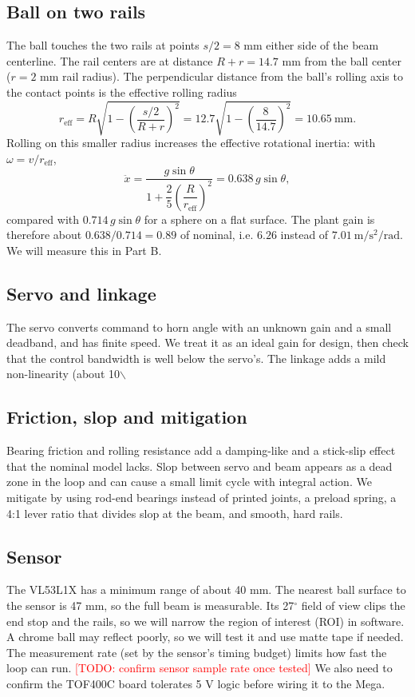 \documentclass[11pt]{article}
\newcommand{\todo}[1]{\textcolor{red}{[TODO: #1]}}
\newcommand{\todo}[1]{\textcolor{red}{[TODO: #1]}}
\begin{document}
\subsection{Ball on two rails}
\label{sec:org491ceb2}
The ball touches the two rails at points \(s/2 = 8\) mm either side of the beam centerline. The rail centers are at distance \(R + r = 14.7\) mm from the ball center (\(r = 2\) mm rail radius). The perpendicular distance from the ball's rolling axis to the contact points is the effective rolling radius
\begin{equation}
r_{\mathrm{eff}} = R\sqrt{1 - \left(\frac{s/2}{R+r}\right)^{2}} = 12.7\sqrt{1 - \left(\frac{8}{14.7}\right)^{2}} = 10.65\ \mathrm{mm}.
\end{equation}
Rolling on this smaller radius increases the effective rotational inertia: with \(\omega = v / r_{\mathrm{eff}}\),
\begin{equation}
\ddot{x} = \frac{g\sin\theta}{1 + \dfrac{2}{5}\left(\dfrac{R}{r_{\mathrm{eff}}}\right)^{2}} = 0.638\,g\sin\theta ,
\end{equation}
compared with \(0.714\,g\sin\theta\) for a sphere on a flat surface. The plant gain is therefore about \(0.638/0.714 = 0.89\) of nominal, i.e. \(6.26\) instead of \(7.01\ \mathrm{m/s^{2}/rad}\). We will measure this in Part B.
\subsection{Servo and linkage}
\label{sec:org47be871}
The servo converts command to horn angle with an unknown gain and a small deadband, and has finite speed. We treat it as an ideal gain for design, then check that the control bandwidth is well below the servo's. The linkage adds a mild non-linearity (about 10$\backslash$%
\subsection{Friction, slop and mitigation}
\label{sec:org1824fb0}
Bearing friction and rolling resistance add a damping-like and a stick-slip effect that the nominal model lacks. Slop between servo and beam appears as a dead zone in the loop and can cause a small limit cycle with integral action. We mitigate by using rod-end bearings instead of printed joints, a preload spring, a 4:1 lever ratio that divides slop at the beam, and smooth, hard rails.
\subsection{Sensor}
\label{sec:orgbcffef6}
The VL53L1X has a minimum range of about 40 mm. The nearest ball surface to the sensor is 47 mm, so the full beam is measurable. Its 27\(^\circ\) field of view clips the end stop and the rails, so we will narrow the region of interest (ROI) in software. A chrome ball may reflect poorly, so we will test it and use matte tape if needed. The measurement rate (set by the sensor's timing budget) limits how fast the loop can run. \todo{confirm sensor sample rate once tested} We also need to confirm the TOF400C board tolerates 5 V logic before wiring it to the Mega.
\end{document}
